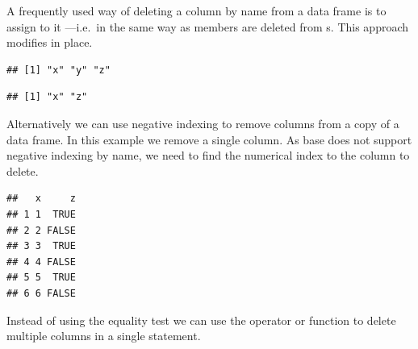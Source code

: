 \documentclass[krantz2]{krantz}\usepackage{knitr}%
\begin{document}
A frequently used way of deleting a column by name from a data frame is to assign  to it ---i.e.\ in the same way as members are deleted from s. This approach modifies  in place.

\begin{knitrout}\footnotesize
{}\color{fgcolor}\begin{kframe}
\begin{alltt}
 \hlkwb{<-} 
\end{alltt}
\begin{verbatim}
## [1] "x" "y" "z"
\end{verbatim}
\begin{alltt}
\hlstd{aa.df[[}\hlstd{]]} \hlkwb{<-} 
\end{alltt}
\begin{verbatim}
## [1] "x" "z"
\end{verbatim}
\end{kframe}
\end{knitrout}

\begin{explainbox}
Alternatively we can use negative indexing to remove columns from a copy of a data frame. In this example we remove a single column. As base \Rlang does not support negative indexing by name, we need to find the numerical index to the column to delete.

\begin{knitrout}\footnotesize
{}\color{fgcolor}\begin{kframe}
\begin{alltt}
\hlstd{a.df[ ,} \hlopt{-}\hlstd{(} \hlopt{==} \hlstd{)]}
\end{alltt}
\begin{verbatim}
##   x     z
## 1 1  TRUE
## 2 2 FALSE
## 3 3  TRUE
## 4 4 FALSE
## 5 5  TRUE
## 6 6 FALSE
\end{verbatim}
\end{kframe}
\end{knitrout}
Instead of using the equality test we can use the operator  or function  to delete multiple columns in a single statement.
\end{explainbox}
\end{document}
